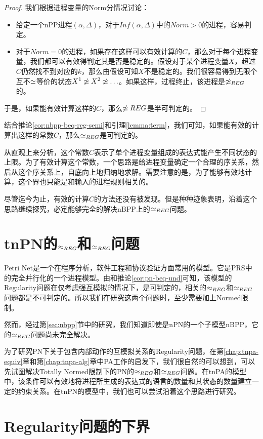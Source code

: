 \begin{proof}
我们根据进程变量的Norm分情况讨论：
\begin{itemize}
\item 给定一个nPP进程$(\alpha,\Delta)$，对于$Inf(\alpha,\Delta)$中的$Norm>0$的进程，容易判定。
\item 对于$Norm=0$的进程，如果存在这样可以有效计算的$C$，那么对于每个进程变量，我们都可以有效得判定其是否是稳定的。假设对于某个进程变量$X$，超过$C$仍然找不到对应的$k$，那么由假设可知$X$不是稳定的。我们很容易得到无限个互不$\simeq$等价的状态$X^1\not\simeq X^2\not\simeq\ldots$。如果这样，过程终止，该进程是$\not\simeq_{REG}$的。
\end{itemize}
于是，如果能有效计算这样的$C$，那么$\not\simeq{REG}$是半可判定的。
\end{proof}

结合推论\ref{cor:nbpp-beq-reg-semi}和引理\ref{lemma:term}，我们可知，如果能有效的计算出这样的常数$C$，那么$\simeq_{REG}$是可判定的。

从直观上来分析，这个常数$C$表示了单个进程变量组成的表达式能产生不同状态的上限。为了有效计算这个常数，一个思路是给进程变量确定一个合理的序关系，然后从这个序关系上，自底向上地归纳地求解。需要注意的是，为了能够有效地计算，这个界也只能是和输入的进程规则相关的。

尽管迄今为止，有效的计算$C$的方法还没有被发现。但是种种迹象表明，沿着这个思路继续探究，必定能够完全的解决nBPP上的$\simeq_{REG}$问题。

\section{tnPN的$\approx_{REG}$和$\simeq_{REG}$问题}
\label{sec:tnPN}

Petri Net是一个在程序分析，软件工程和协议验证方面常用的模型。它是PRS中的完全并行化的一个进程模型。由\cite{Jancar1996}和推论\ref{cor:pn-beq-und}可知，该模型的Regularity问题在仅考虑强互模拟的情况下，是可判定的，相关的$\approx_{REG}$和$\simeq_{REG}$问题都是不可判定的。所以我们在研究这两个问题时，至少需要加上Normed限制。

然而，经过第\ref{sec:nbpp}节中的研究，我们知道即使是nPN的一个子模型nBPP，它的$\simeq_{REG}$问题尚未完全解决。

为了研究PN下关于包含内部动作的互模拟关系的Regularity问题，在第\ref{chap:tnpa-equiv}章和第\ref{chap:tnpa-alg}章中PA工作的启发下，我们很自然的可以想到，可以先试图解决Totally Normed限制下的PN的$\approx_{REG}$和$\simeq_{REG}$问题。在tnPA的模型中，该条件可以有效地将进程所生成的表达式的语言的数量和其状态的数量建立一定的约束关系。在tnPN的模型中，我们也可以尝试沿着这个思路进行研究。

\section{Regularity问题的下界}
\label{sec:lower-bound}


